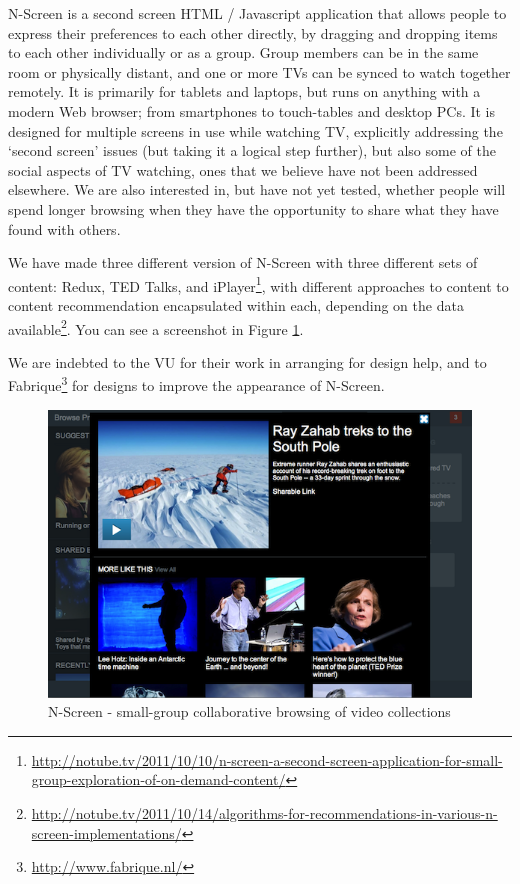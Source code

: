 \documentclass{notube}
\begin{document}
N-Screen is a second screen HTML / Javascript application that allows people to express their preferences to each other directly, by dragging and dropping items to each other individually or as a group. Group members can be in the same room or physically distant, and one or more TVs can be synced to watch together remotely. It is primarily for tablets and laptops, but runs on anything with a modern Web browser; from smartphones to touch-tables and desktop PCs. It is designed for multiple screens in use while watching TV, explicitly addressing the `second screen' issues (but taking it a logical step further), but also some of the social aspects of TV watching, ones that we believe have not been addressed elsewhere. We are also interested in, but have not yet tested, whether people will spend longer browsing when they have the opportunity to share what they have found with others.

We have made three different version of N-Screen with three different sets of content: Redux, TED Talks, and iPlayer\footnote{\url{http://notube.tv/2011/10/10/n-screen-a-second-screen-application-for-small-group-exploration-of-on-demand-content/}}, with different approaches to content to content recommendation encapsulated within each, depending on the data available\footnote{\url{http://notube.tv/2011/10/14/algorithms-for-recommendations-in-various-n-screen-implementations/}}. You can see a screenshot in Figure \ref{fig:nscreen}.

We are indebted to the VU for their work in arranging for design help, and to Fabrique\footnote{\url{http://www.fabrique.nl/}} for designs to improve the appearance of N-Screen.

\begin{figure}[htbp]
\begin{center}
\includegraphics[width=6in]{images/nscreen.png}
\caption{N-Screen - small-group collaborative browsing of video collections} \label{fig:nscreen}
\end{center}
\end{figure} 
\end{document}
